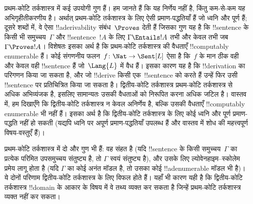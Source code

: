 \documentclass[../../../include/open-logic-section]{subfiles}
\begin{document}


प्रथम-कोटि तर्कशास्त्र में कई उपयोगी गुण हैं। हम जानते हैं कि यह
निर्णेय नहीं है, किंतु कम-से-कम यह अभिगृहीतीकरणीय है। अर्थात् प्रथम-कोटि
तर्कशास्त्र के लिए ऐसी प्रमाण-पद्धतियाँ हैं जो ध्वनि और पूर्ण हैं; दूसरे
शब्दों में, वे ऐसा !!a{derivability} संबंध~$\Proves$ देती हैं जिसका गुण यह
है कि !!{sentence} के किसी भी समुच्चय~$\Gamma$ और !!{sentence}~$!A$ के लिए
$\Gamma \Entails !A$ तभी और केवल तभी जब $\Gamma \Proves !A$। विशेषतः
इसका अर्थ है कि प्रथम-कोटि तर्कशास्त्र की वैधताएँ !!{computably
  enumerable} हैं। कोई संगणनीय फलन~$f\colon \Nat \to \Sent[L]$ ऐसा है
कि~$f$ के मान ठीक वही और केवल वही !!{sentence} हैं जो~$\Lang{L}$ में वैध
हैं। इसका कारण यह है कि !!{derivation} का परिगणन किया जा सकता है, और जो
!!{derive} किसी एक~!!{sentence} को करते हैं उन्हें फिर उसी !!{sentence} पर
प्रतिचित्रित किया जा सकता है। द्वितीय-कोटि तर्कशास्त्र प्रथम-कोटि
तर्कशास्त्र से अधिक अभिव्यंजक है, इसलिए सामान्यतः उसकी वैधताओं को निरूपित
करना अधिक जटिल है। वास्तव में, हम दिखाएँगे कि द्वितीय-कोटि तर्कशास्त्र न
केवल अनिर्णेय है, बल्कि उसकी वैधताएँ !!{computably enumerable} भी नहीं हैं।
इसका अर्थ है कि द्वितीय-कोटि तर्कशास्त्र के लिए कोई ध्वनि और पूर्ण
प्रमाण-पद्धति नहीं हो सकती (यद्यपि ध्वनि पर अपूर्ण प्रमाण-पद्धतियाँ उपलब्ध
हैं और वास्तव में शोध की महत्त्वपूर्ण विषय-वस्तुएँ हैं)।

प्रथम-कोटि तर्कशास्त्र में दो और गुण भी हैं: वह संहत है (यदि !!{sentence}
के किसी समुच्चय~$\Gamma$ का प्रत्येक परिमित उपसमुच्चय संतुष्ट्य है, तो
$\Gamma$ स्वयं संतुष्ट्य है), और उसके लिए ल्योवेनहाइम--स्कोलेम प्रमेय लागू
होता है (यदि $\Gamma$ का कोई अनंत मॉडल है, तो उसका कोई !!a{denumerable}
मॉडल भी है)। ये दोनों परिणाम द्वितीय-कोटि तर्कशास्त्र के लिए विफल होते हैं।
यहाँ भी कारण यही है कि द्वितीय-कोटि तर्कशास्त्र !!{domain} के आकार के विषय
में वे तथ्य व्यक्त कर सकता है जिन्हें प्रथम-कोटि तर्कशास्त्र व्यक्त नहीं
कर सकता।
\end{document}
